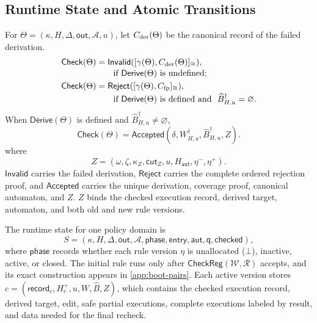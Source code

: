 \subsection{Runtime State and Atomic Transitions}
\label{app:runtime-transitions}

For \(\Theta=(\kappa,H,\Delta,\mathsf{out},\mathcal A,u)\), let \(C_{\rm der}(\Theta)\) be the canonical record of the failed derivation.
\[
\begin{aligned}
\mathsf{Check}(\Theta)
 &=\mathsf{Invalid}([\gamma(\Theta),C_{\rm der}(\Theta)]_{\cong}),\\[-2pt]
 &\qquad\text{if }\mathsf{Derive}(\Theta)\text{ is undefined};\\
\mathsf{Check}(\Theta)
 &=\mathsf{Reject}([\gamma(\Theta),C_{\rm fp}]_{\cong}),\\[-2pt]
 &\qquad\text{if }\mathsf{Derive}(\Theta)\text{ is defined and }\
   \widehat B^\dagger_{H,u}=\varnothing.
\end{aligned}
\]
When \(\mathsf{Derive}(\Theta)\) is defined and
\(\widehat B^\dagger_{H,u}\ne\varnothing\),
\[
\mathsf{Check}(\Theta)=
\mathsf{Accepted}(\delta,W^\dagger_{H,u},
 \widehat B^\dagger_{H,u},Z).
\]
where
\[
 Z=(\omega,\zeta,\kappa_Z,\mathsf{cut}_Z,u,
    H_{\mathsf{aut}},\eta^-,\eta^+).
\]
\(\mathsf{Invalid}\) carries the failed derivation, \(\mathsf{Reject}\) carries the complete ordered rejection proof, and \(\mathsf{Accepted}\) carries the unique derivation, coverage proof, canonical automaton, and \(Z\).
\(Z\) binds the checked execution record, derived target, automaton, and both old and new rule versions.

The runtime state for one policy domain is
\[
S=(\kappa,H,\Delta,\mathsf{out},\mathcal A,
    \mathsf{phase},\mathsf{entry},\mathsf{aut},\mathsf q,\mathsf{checked}),
\]
where \(\mathsf{phase}\) records whether each rule version \(\eta\) is unallocated (\(\bot\)), inactive, active, or closed.
The initial rule runs only after \(\mathsf{CheckReg}(\mathcal W,\mathcal R)\) accepts, and its exact construction appears in \cref{app:boot-pairs}.
Each active version stores \(c=(\mathsf{record}_c,H_c^+,u,W,\widehat B,Z)\), which contains the checked execution record, derived target, edit, safe partial executions, complete executions labeled by result, and data needed for the final recheck.

